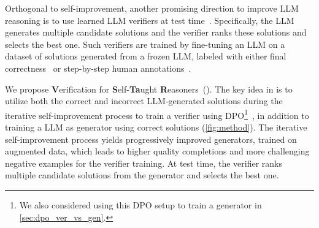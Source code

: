 Orthogonal to self-improvement, another promising direction to improve LLM reasoning is to use learned LLM verifiers at test time~\citep{DBLP:journals/corr/abs-2110-14168, DBLP:journals/corr/abs-2312-08935}. Specifically, the LLM generates
multiple candidate solutions and the verifier ranks these solutions and selects the best one. Such verifiers are trained by fine-tuning an LLM on a dataset of solutions generated from a frozen LLM, labeled with either final correctness~\citep[ORM,][]{DBLP:journals/corr/abs-2110-14168} or step-by-step human annotations~\citep{DBLP:journals/corr/abs-2305-20050}. 

We propose \textbf{V}erification for \textbf{S}elf-\textbf{Ta}ught \textbf{R}easoners~(\vstar).
The key idea in \vstar{} is to utilize both the correct and incorrect LLM-generated solutions during the iterative self-improvement process to train a verifier using DPO\footnote{We also considered using this DPO setup to train a generator in \autoref{sec:dpo_ver_vs_gen}.}~\citep{rafailov2023direct}, in addition to training a LLM as generator using correct solutions (\autoref{fig:method}).  
The iterative self-improvement process yields progressively improved generators, trained on augmented data, which leads to higher quality completions and more challenging negative examples for the verifier training. At test time, the verifier ranks multiple candidate solutions from the generator and selects the best one.




